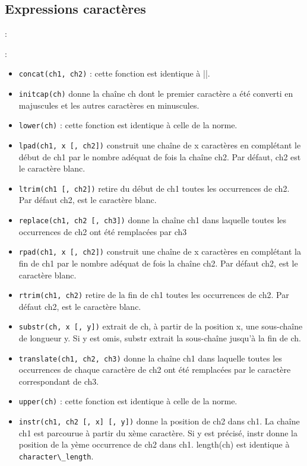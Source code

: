 \documentclass[10pt]{beamer}
\begin{document}
\subsection{Expressions caractères}
\begin{frame}{\secname : \subsecname}
    
\end{frame}

\begin{frame}[allowframebreaks]{\secname : \subsecname}
    \begin{itemize}
        \item \lstinline[language=plsql]!concat(ch1, ch2)! : cette fonction est identique à ||.
        \item \lstinline[language=plsql]!initcap(ch)! donne la chaîne ch dont le premier caractère a été converti en majuscules et les autres caractères en minuscules.
        \item \lstinline[language=plsql]!lower(ch)! : cette fonction est identique à celle de la norme.
        \item \lstinline[language=plsql]!lpad(ch1, x [, ch2])! construit une chaîne de x caractères en complétant le début de ch1 par le nombre adéquat de fois la chaîne ch2. Par défaut, ch2 est le caractère blanc.
        \item \lstinline[language=plsql]!ltrim(ch1 [, ch2])! retire du début de ch1 toutes les occurrences de ch2. Par défaut ch2, est le caractère blanc.
        \item \lstinline[language=plsql]!replace(ch1, ch2 [, ch3])! donne la chaîne ch1 dans laquelle toutes les occurrences de ch2 ont été remplacées par ch3
        \item \lstinline[language=plsql]!rpad(ch1, x [, ch2])! construit une chaîne de x caractères en complétant la fin de ch1 par le nombre adéquat de fois la chaîne ch2. Par défaut ch2, est le caractère blanc.
        \item \lstinline[language=plsql]!rtrim(ch1, ch2)! retire de la fin de ch1 toutes les occurrences de ch2. Par défaut ch2, est le caractère blanc.
        \item \lstinline[language=plsql]!substr(ch, x [, y])! extrait de ch, à partir de la position x, une sous-chaîne de longueur y. Si y est omis, substr extrait la sous-chaîne jusqu’à la fin de ch.
        \item \lstinline[language=plsql]!translate(ch1, ch2, ch3)! donne la chaîne ch1 dans laquelle toutes les occurrences de chaque caractère de ch2 ont été remplacées par le caractère correspondant de ch3.
        \item \lstinline[language=plsql]!upper(ch)! : cette fonction est identique à celle de la norme.
        \item \lstinline[language=plsql]!instr(ch1, ch2 [, x] [, y])! donne la position de ch2 dans ch1. La chaîne ch1 est parcourue à partir du xème caractère. Si y est précisé, instr donne la position de la yème occurrence de ch2 dans ch1.
              length(ch) est identique à \lstinline[language=bnf]!character\_length!.
    \end{itemize}
\end{frame}
\end{document}
